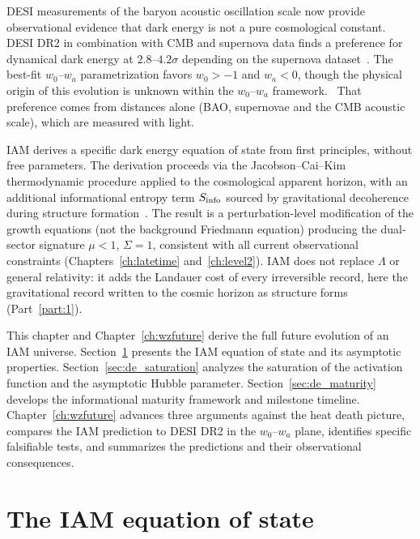 DESI measurements of the baryon acoustic oscillation scale now provide observational evidence that dark energy is not a pure cosmological
constant. DESI DR2 in combination with CMB and supernova data finds a preference for dynamical dark energy at $2.8$--$4.2\sigma$ depending on the
supernova dataset~\cite{DESI2025}. The best-fit $w_0$--$w_a$ parametrization favors $w_0>-1$ and $w_a<0$, though the physical origin of this
evolution is unknown within the $w_0$--$w_a$ framework. \observed\ That preference comes from distances alone (BAO, supernovae and the CMB
acoustic scale), which are measured with light.

IAM derives a specific dark energy equation of state from first principles, without free parameters. The derivation proceeds via the
Jacobson--Cai--Kim thermodynamic procedure applied to the cosmological apparent horizon, with an additional informational entropy term
$S_{\rm info}$ sourced by gravitational decoherence during structure formation~\cite{Jacobson1995,CaiKim2005}. The result is a perturbation-level
modification of the growth equations (not the background Friedmann equation) producing the dual-sector signature $\mu<1$, $\Sigma=1$, consistent
with all current observational constraints (Chapters~\ref{ch:latetime} and~\ref{ch:level2}). IAM does not replace $\Lambda$ or general
relativity: it adds the Landauer cost of every irreversible record, here the gravitational record written to the cosmic horizon as structure
forms (Part~\ref{part:1}).

This chapter and Chapter~\ref{ch:wzfuture} derive the full future evolution of an IAM universe. Section~\ref{sec:de_eos} presents the IAM
equation of state and its asymptotic properties. Section~\ref{sec:de_saturation} analyzes the saturation of the activation function and the
asymptotic Hubble parameter. Section~\ref{sec:de_maturity} develops the informational maturity framework and milestone timeline.
Chapter~\ref{ch:wzfuture} advances three arguments against the heat death picture, compares the IAM prediction to DESI DR2 in the $w_0$--$w_a$
plane, identifies specific falsifiable tests, and summarizes the predictions and their observational consequences.

\section{The IAM equation of state}\label{sec:de_eos}
